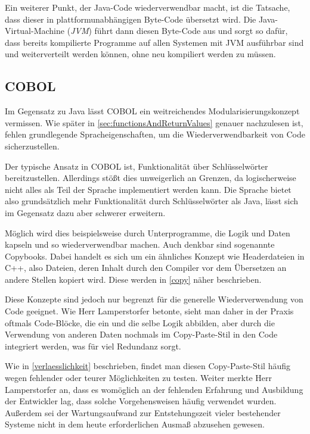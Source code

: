Ein weiterer Punkt, der Java-Code wiederverwendbar macht, ist die Tatsache, dass dieser in plattformunabhängigen Byte-Code übersetzt wird. Die Java-Virtual-Machine (\textit{JVM}) führt dann diesen Byte-Code aus und sorgt so dafür, dass bereits kompilierte Programme auf allen Systemen mit JVM ausführbar sind und weiterverteilt werden können, ohne neu kompiliert werden zu müssen.

\subsection*{COBOL}
Im Gegensatz zu Java lässt COBOL ein weitreichendes Modularisierungskonzept vermissen. Wie später in \autoref{sec:functionsAndReturnValues} genauer nachzulesen ist, fehlen grundlegende Spracheigenschaften, um die Wiederverwendbarkeit von Code sicherzustellen. 

Der typische Ansatz in COBOL ist, Funktionalität über Schlüsselwörter bereitzustellen. Allerdings stößt dies unweigerlich an Grenzen, da logischerweise nicht alles als Teil der Sprache implementiert werden kann. Die Sprache bietet also grundsätzlich mehr Funktionalität durch Schlüsselwörter als Java, lässt sich im Gegensatz dazu aber schwerer erweitern. 

Möglich wird dies beispielsweise durch Unterprogramme, die Logik und Daten kapseln und so wiederverwendbar machen. Auch denkbar sind sogenannte Copybooks. Dabei handelt es sich um ein ähnliches Konzept wie Headerdateien in C++, also Dateien, deren Inhalt durch den Compiler vor dem Übersetzen an andere Stellen kopiert wird. Diese werden in \autoref{copy} näher beschrieben.

Diese Konzepte sind jedoch nur begrenzt für die generelle Wiederverwendung von Code geeignet. Wie Herr Lamperstorfer betonte, sieht man daher in der Praxis oftmals Code-Blöcke, die ein und die selbe Logik abbilden, aber durch die Verwendung von anderen Daten nochmals im Copy-Paste-Stil in den Code integriert werden, was für viel Redundanz sorgt. 

Wie in \autoref{verlaesslichkeit} beschrieben, findet man diesen Copy-Paste-Stil häufig wegen fehlender oder teurer Möglichkeiten zu testen. Weiter merkte Herr Lamperstorfer an, dass es womöglich an der fehlenden Erfahrung und Ausbildung der Entwickler lag, dass solche Vorgehensweisen häufig verwendet wurden. Außerdem sei der Wartungsaufwand zur Entstehungszeit vieler bestehender Systeme nicht in dem heute erforderlichen Ausmaß abzusehen gewesen.

